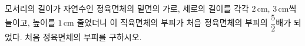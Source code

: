 모서리의 길이가 자연수인 정육면체의 밑면의 가로, 세로의 길이를 각각 $2\,\mathrm{cm}$, $3\,\mathrm{cm}$씩 늘이고, 높이를 $1\,\mathrm{cm}$ 줄였더니 이 직육면체의 부피가 처음 정육면체의 부피의 $\dfrac{5}{2}$배가 되었다. 처음 정육면체의 부피를 구하시오.
